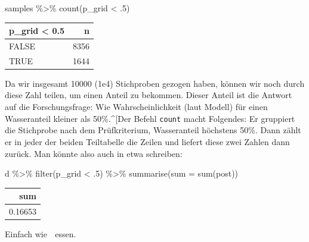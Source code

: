 \documentclass[
  a4paper,
  DIV=11]{scrreprt}
\newenvironment{Shaded}{\begin{snugshade}}{\end{snugshade}}
\newcommand{\AttributeTok}[1]{\textcolor[rgb]{0.40,0.45,0.13}{#1}}
\newcommand{\DecValTok}[1]{\textcolor[rgb]{0.68,0.00,0.00}{#1}}
\newcommand{\FunctionTok}[1]{\textcolor[rgb]{0.28,0.35,0.67}{#1}}
\newcommand{\NormalTok}[1]{\textcolor[rgb]{0.00,0.23,0.31}{#1}}
\newcommand{\SpecialCharTok}[1]{\textcolor[rgb]{0.37,0.37,0.37}{#1}}
\theoremstyle{definition}
\theoremstyle{remark}
\begin{document}
\begin{Shaded}
\begin{Highlighting}[]
\NormalTok{samples }\SpecialCharTok{\%\textgreater{}\%}
  \FunctionTok{count}\NormalTok{(p\_grid }\SpecialCharTok{\textless{}}\NormalTok{ .}\DecValTok{5}\NormalTok{) }
\end{Highlighting}
\end{Shaded}

\begin{longtable}[]{@{}lr@{}}
\toprule()
p\_grid \textless{} 0.5 & n \\
\midrule()
\endhead
FALSE & 8356 \\
TRUE & 1644 \\
\bottomrule()
\end{longtable}

Da wir insgesamt 10000 (1e4) Stichproben gezogen haben, können wir noch
durch diese Zahl teilen, um einen Anteil zu bekommen. Dieser Anteil ist
die Antwort auf die Forschungsfrage: Wie Wahrscheinlichkeit (laut
Modell) für einen Wasseranteil kleiner als 50\%.\^{}{[}Der Befehl
\texttt{count} macht Folgendes: Er gruppiert die Stichprobe nach dem
Prüfkriterium, Wasseranteil höchstens 50\%. Dann zählt er in jeder der
beiden Teiltabelle die Zeilen und liefert diese zwei Zahlen dann zurück.
Man könnte also auch in etwa schreiben:

\begin{Shaded}
\begin{Highlighting}[]
\NormalTok{d }\SpecialCharTok{\%\textgreater{}\%}
  \FunctionTok{filter}\NormalTok{(p\_grid }\SpecialCharTok{\textless{}}\NormalTok{ .}\DecValTok{5}\NormalTok{) }\SpecialCharTok{\%\textgreater{}\%}
  \FunctionTok{summarise}\NormalTok{(}\AttributeTok{sum =} \FunctionTok{sum}\NormalTok{(post))}
\end{Highlighting}
\end{Shaded}

\begin{longtable}[]{@{}r@{}}
\toprule()
sum \\
\midrule()
\endhead
0.16653 \\
\bottomrule()
\end{longtable}

Einfach wie 🍰 essen.
\end{document}
